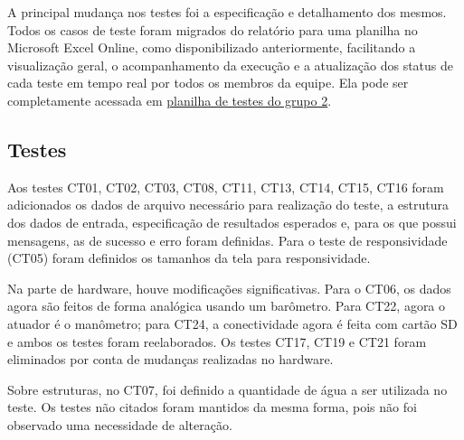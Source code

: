 \begin{samepage}

A principal mudança nos testes foi a especificação e detalhamento dos mesmos. Todos os casos de teste foram migrados do relatório para uma planilha no Microsoft Excel Online, como disponibilizado anteriormente, facilitando a visualização geral, o acompanhamento da execução e a atualização dos status de cada teste em tempo real por todos os membros da equipe. Ela pode ser completamente acessada em
\href{https://unbbr.sharepoint.com/:x:/s/PI1-Grupo2330/EY-ZE1arh2RGgJju4ij_Er4BGhCN5S1qYQiIwdHMMRtLBg?e=fs9Vxi}{planilha de testes do grupo 2}.


\subsection{Testes}

Aos testes CT01, CT02, CT03, CT08, CT11, CT13, CT14, CT15, CT16 foram adicionados os dados de arquivo necessário para realização do teste, a estrutura dos dados de entrada, especificação de resultados esperados e, para os que possui mensagens, as de sucesso e erro foram definidas. Para o teste de responsividade (CT05) foram definidos os tamanhos da tela para responsividade. 

Na parte de hardware, houve modificações significativas. Para o CT06, os dados agora são feitos de forma analógica usando um barômetro.  Para CT22, agora o atuador é o manômetro; para CT24, a conectividade agora é feita com cartão SD e ambos os testes foram reelaborados. Os testes CT17, CT19 e CT21 foram eliminados por conta de mudanças realizadas no hardware. 

Sobre estruturas, no CT07, foi definido a quantidade de água a ser utilizada no teste.  Os testes não citados foram mantidos da mesma forma, pois não foi observado uma necessidade de alteração. 


\end{samepage}
